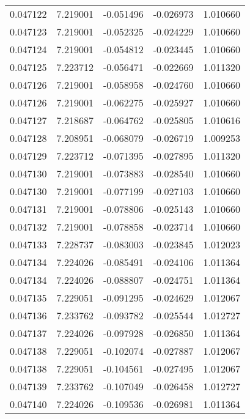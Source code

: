 \begin{tabular}{lrrrr}
0.047122    &  7.219001 & -0.051496 & -0.026973 &             1.010660 \\
0.047123    &  7.219001 & -0.052325 & -0.024229 &             1.010660 \\
0.047124    &  7.219001 & -0.054812 & -0.023445 &             1.010660 \\
0.047125    &  7.223712 & -0.056471 & -0.022669 &             1.011320 \\
0.047126    &  7.219001 & -0.058958 & -0.024760 &             1.010660 \\
0.047126    &  7.219001 & -0.062275 & -0.025927 &             1.010660 \\
0.047127    &  7.218687 & -0.064762 & -0.025805 &             1.010616 \\
0.047128    &  7.208951 & -0.068079 & -0.026719 &             1.009253 \\
0.047129    &  7.223712 & -0.071395 & -0.027895 &             1.011320 \\
0.047130    &  7.219001 & -0.073883 & -0.028540 &             1.010660 \\
0.047130    &  7.219001 & -0.077199 & -0.027103 &             1.010660 \\
0.047131    &  7.219001 & -0.078806 & -0.025143 &             1.010660 \\
0.047132    &  7.219001 & -0.078858 & -0.023714 &             1.010660 \\
0.047133    &  7.228737 & -0.083003 & -0.023845 &             1.012023 \\
0.047134    &  7.224026 & -0.085491 & -0.024106 &             1.011364 \\
0.047134    &  7.224026 & -0.088807 & -0.024751 &             1.011364 \\
0.047135    &  7.229051 & -0.091295 & -0.024629 &             1.012067 \\
0.047136    &  7.233762 & -0.093782 & -0.025544 &             1.012727 \\
0.047137    &  7.224026 & -0.097928 & -0.026850 &             1.011364 \\
0.047138    &  7.229051 & -0.102074 & -0.027887 &             1.012067 \\
0.047138    &  7.229051 & -0.104561 & -0.027495 &             1.012067 \\
0.047139    &  7.233762 & -0.107049 & -0.026458 &             1.012727 \\
0.047140    &  7.224026 & -0.109536 & -0.026981 &             1.011364 \\

\end{tabular}
